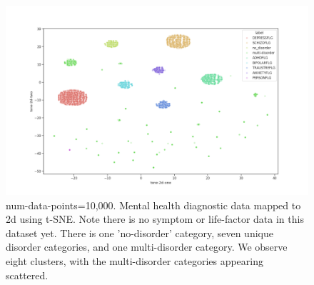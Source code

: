 \documentclass[11pt]{amsart}
\begin{document}
\begin{figure}[h]
\caption{num-data-points=10,000. Mental health diagnostic data mapped to 2d using t-SNE. Note there is no symptom or life-factor data in this dataset yet. There is one 'no-disorder' category, seven unique disorder categories, and one multi-disorder category. We observe eight clusters, with the multi-disorder categories appearing scattered.}
\centering
\includegraphics[width=1.0\textwidth]{tsne_plot_mental-health_client-level-data_perplexity=10_num-points=10_000_labeled}
\end{figure}
\end{document}

